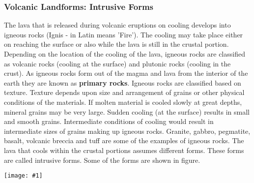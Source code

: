 \documentclass[8pt, a4paper, oneside, twocolumn]{extarticle}
\newcommand{\ph}[1]{
    \texttt{[image: \#1]}
}
\begin{document}
\subsubsection{Volcanic Landforms: Intrusive Forms}
The lava that is released during volcanic eruptions on cooling develops into igneous rocks (Ignis - in Latin means 'Fire'). The cooling may take place either on reaching the surface or also while the lava is still in the crustal portion. Depending on the location of the cooling of the lava, igneous rocks are classified as volcanic rocks (cooling at the surface) and plutonic rocks (cooling in the crust). As igneous rocks form out of the magma and lava from the interior of the earth they are known as \textbf{primary rocks}. Igneous rocks are classified based on texture. Texture depends upon size and arrangement of grains or other physical conditions of the materials. If molten material is cooled slowly at great depths, mineral grains may be very large. Sudden cooling (at the surface) results in small and smooth grains. Intermediate conditions of cooling would result in intermediate sizes of grains making up igneous rocks. Granite, gabbro, pegmatite, basalt, volcanic breccia and tuff are some of the examples of igneous rocks. The lava that cools within the crustal portions assumes different forms. These forms are called intrusive forms. Some of the forms are shown in figure.

\ph{if}
\end{document}
